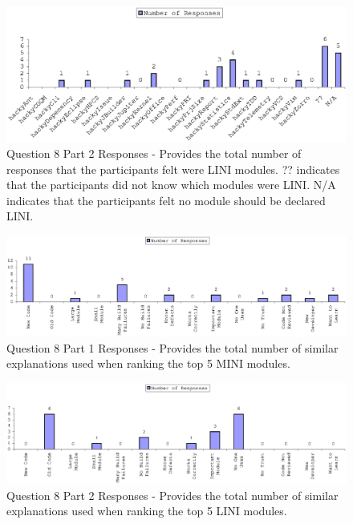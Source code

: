 \begin{figure}[!h]
  \centering
  \includegraphics[width=1.0\textwidth]{figs/Results/pre-selection-questionnaire-82.eps}
  \caption[Question 8 Part 2 Responses]{Question 8 Part 2 Responses -
    Provides the total number of responses that the participants felt were
    LINI modules. ?? indicates that the participants did not know which
    modules were LINI. N/A indicates that the participants felt no module
    should be declared LINI.}
  \label{fig:pre-selection-questionnaire-results-82}
\end{figure}

\clearpage
\begin{figure}[!h]
  \centering
  \includegraphics[width=1.0\textwidth]{figs/Results/pre-selection-questionnaire-8-explain.eps}
  \caption[Question 8 Part 1 Responses]{Question 8 Part 1 Responses -
    Provides the total number of similar explanations used when ranking the 
    top 5 MINI modules.}
  \label{fig:pre-selection-questionnaire-results-8-explain}
\end{figure}

\begin{figure}[!h]
  \centering
  \includegraphics[width=1.0\textwidth]{figs/Results/pre-selection-questionnaire-82-explain.eps}
  \caption[Question 8 Part 2 Responses]{Question 8 Part 2 Responses -
    Provides the total number of similar explanations used when ranking the 
    top 5 LINI modules.}
  \label{fig:pre-selection-questionnaire-results-82-explain}
\end{figure}



